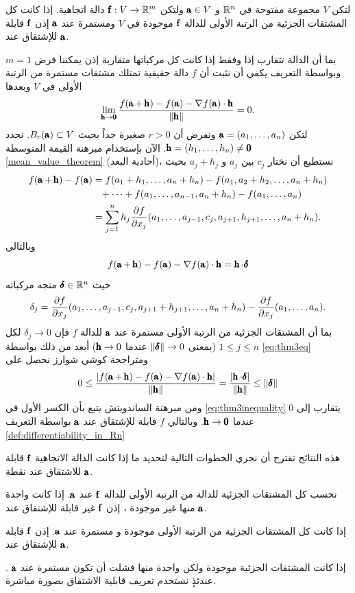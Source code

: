 \begin{theorem}
    لتكن $V$ مجموعة مفتوحة في $\R^n$ و $\A\in V$ ولتكن $\f:V\to\R^m$ دالة اتجاهية. إذا كانت كل المشتقات الجزئية من الرتبة الأولى للدالة $\f$ موجودة في $V$ ومستمرة عند $\A$ إذن $\f$ قابلة للإشتقاق عند $\A$.
\end{theorem}
\begin{myproof}
    بما أن الدالة تتقارب إذا وفقط إذا كانت كل مركباتها متقاربة إذن يمكننا فرض $m=1$ وبواسطة التعريف يكفي أن نثبت أن $f$ دالة حقيقية تمتلك مشتقات مستمرة من الرتبة الأولى في $V$ وبعدها 
    \[
    \lim\limits_{\h\to\Bzero}\frac{f(\A+\h)-f(\A)-\nabla f(\A)\cdot\h}{\norm{\h}}=0.
    \]
    لتكن $\A=(a_1,\dots,a_n)$ ونفرض أن $r>0$ صغيرة جداً بحيث $B_r(\A)\subset V$. نحدد $\h=(h_1,\dots,h_n)\neq\Bzero$. الآن بإستخدام مبرهنة القيمة المتوسطة \ref{mean_value_theorem} (أحادية البعد)، نستطيع أن نختار $c_j$ بين $a_j$ و $a_j+h_j$ بحيث
    \begin{align*}
    f(\A+\h)-f(\A)&=f(a_1+h_1,\dots,a_n+h_n)-f(a_1,a_2+h_2,\dots,a_n+h_n)\\
    &\phantom{=}+\dots+f(a_1,\dots,a_{n-1},a_n+h_n)-f(a_1,\dots,a_n)\\
    &=\sum_{j=1}^{n}h_j\pder{f}{x_j}(a_1,\dots,a_{j-1},c_j,a_{j+1},h_{j+1},\dots,a_n+h_n).
    \end{align*}
    وبالتالي
    \begin{equation}\label{eq:thm3eq}
        f(\A+\h)-f(\A)-\nabla f(\A)\cdot \h=\h\cdot \pmb{\delta}
    \end{equation}
    حيث $\pmb{\delta}\in\R^n$ متجه مركباته
\[
\delta_j=\pder{f}{x_j}(a_1,\dots,a_{j-1},c_j,a_{j+1}+h_{j+1},\dots,a_n+h_n)-\pder{f}{x_j}(a_1,\dots,a_n).
\]
بما أن المشتقات الجزئية من الرتبة الأولى مستمرة عند $\A$ للدالة $f$ فإن $\delta_j\to0$ لكل $1\leq j\leq n$ (بمعنى $\norm{\pmb{\delta}}\to 0$ عندما $\h\to0$) أبعد من ذلك بواسطة \eqref{eq:thm3eq} ومتراجحة كوشي شوارز نحصل على
\begin{equation}\label{eq:thm3inequality}
    0\leq\frac{\abs{f(\A+\h)-f(\A)-\nabla f(\A)\cdot\h}}{\norm{\h}}=\frac{\abs{\h\cdot\pmb{\delta}}}{\norm{\h}}\leq\norm{\pmb{\delta}}
\end{equation}
ومن مبرهنة الساندويتش يتبع بأن الكسر الأول في \eqref{eq:thm3inequality} يتقارب إلى $0$ عندما $\h\to\Bzero$. وبالتالي $f$ قابلة للإشتقاق عند $\A$ بواسطة التعريف \eqref{def:differentiability_in_Rn}
\end{myproof}

    هذه النتائج تقترح أن نجري الخطوات التالية لتحديد ما إذا كانت الدالة الاتجاهية $\f$ قابلة للاشتقاق عند نقطة $\A$.
    \begin{tasks}
        \task[1.] نحسب كل المشتقات الجزئية للدالة من الرتبة الأولى للدالة $\f$ عند $\A$. إذا كانت واحدة منها غير موجودة ، إذن $\f$ غير قابلة للإشتقاق عند $\A$.

        \task[2.] إذا كانت كل المشتقات الجزئية من الرتبة الأولى موجودة و مستمرة عند $\A$. إذن $\f$ قابلة للإشتقاق عند $\A$.

        \task[3.] إذا كانت المشتقات الجزئية موجودة ولكن واحدة منها فشلت أن تكون مستمرة عند $\A$ . عندئذٕ نستخدم تعريف قابلية الاشتقاق بصورة مباشرة.
    \end{tasks}

